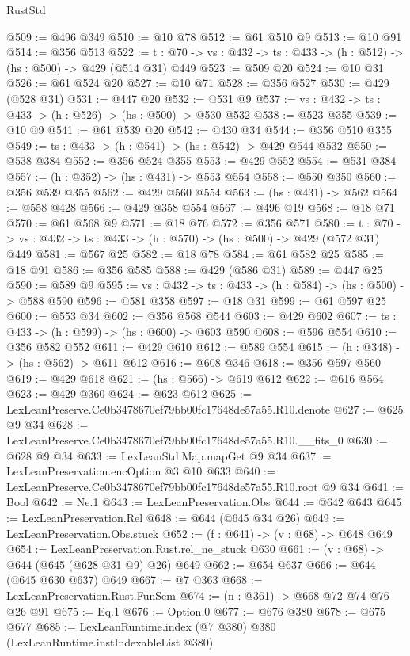 \begin{lexlean}{RustStd}
\begin{coremodule}
@509 := @496 @349
@510 := @10 @78
@512 := @61 @510 @9
@513 := @10 @91
@514 := @356 @513
@522 := {t : @70} -> {vs : @432} -> {ts : @433} -> (h : @512) -> (hs : @500) -> @429 (@514 @31) @449
@523 := @509 @20
@524 := @10 @31
@526 := @61 @524 @20
@527 := @10 @71
@528 := @356 @527
@530 := @429 (@528 @31)
@531 := @447 @20
@532 := @531 @9
@537 := {vs : @432} -> {ts : @433} -> (h : @526) -> (hs : @500) -> @530 @532
@538 := @523 @355
@539 := @10 @9
@541 := @61 @539 @20
@542 := @430 @34
@544 := @356 @510 @355
@549 := {ts : @433} -> (h : @541) -> (hs : @542) -> @429 @544 @532
@550 := @538 @384
@552 := @356 @524 @355
@553 := @429 @552
@554 := @531 @384
@557 := (h : @352) -> (hs : @431) -> @553 @554
@558 := @550 @350
@560 := @356 @539 @355
@562 := @429 @560 @554
@563 := (hs : @431) -> @562
@564 := @558 @428
@566 := @429 @358 @554
@567 := @496 @19
@568 := @18 @71
@570 := @61 @568 @9
@571 := @18 @76
@572 := @356 @571
@580 := {t : @70} -> {vs : @432} -> {ts : @433} -> (h : @570) -> (hs : @500) -> @429 (@572 @31) @449
@581 := @567 @25
@582 := @18 @78
@584 := @61 @582 @25
@585 := @18 @91
@586 := @356 @585
@588 := @429 (@586 @31)
@589 := @447 @25
@590 := @589 @9
@595 := {vs : @432} -> {ts : @433} -> (h : @584) -> (hs : @500) -> @588 @590
@596 := @581 @358
@597 := @18 @31
@599 := @61 @597 @25
@600 := @553 @34
@602 := @356 @568 @544
@603 := @429 @602
@607 := {ts : @433} -> (h : @599) -> (hs : @600) -> @603 @590
@608 := @596 @554
@610 := @356 @582 @552
@611 := @429 @610
@612 := @589 @554
@615 := (h : @348) -> (hs : @562) -> @611 @612
@616 := @608 @346
@618 := @356 @597 @560
@619 := @429 @618
@621 := (hs : @566) -> @619 @612
@622 := @616 @564
@623 := @429 @360
@624 := @623 @612
@625 := LexLeanPreserve.Ce0b3478670ef79bb00fc17648de57a55.R10.denote
@627 := @625 @9 @34
@628 := LexLeanPreserve.Ce0b3478670ef79bb00fc17648de57a55.R10.__fits_0
@630 := @628 @9 @34
@633 := LexLeanStd.Map.mapGet @9 @34
@637 := LexLeanPreservation.encOption @3 @10 @633
@640 := LexLeanPreserve.Ce0b3478670ef79bb00fc17648de57a55.R10.root @9 @34
@641 := Bool
@642 := Ne.{1}
@643 := LexLeanPreservation.Obs
@644 := @642 @643
@645 := LexLeanPreservation.Rel
@648 := @644 (@645 @34 @26)
@649 := LexLeanPreservation.Obs.stuck
@652 := (f : @641) -> (v : @68) -> @648 @649
@654 := LexLeanPreservation.Rust.rel_ne_stuck @630
@661 := (v : @68) -> @644 (@645 (@628 @31 @9) @26) @649
@662 := @654 @637
@666 := @644 (@645 @630 @637) @649
@667 := @7 @363
@668 := LexLeanPreservation.Rust.FunSem
@674 := (n : @361) -> @668 @72 @74 @76 @26 @91
@675 := Eq.{1}
@676 := Option.{0}
@677 := @676 @380
@678 := @675 @677
@685 := LexLeanRuntime.index (@7 @380) @380 (LexLeanRuntime.instIndexableList @380)

\end{coremodule}
\end{lexlean}
